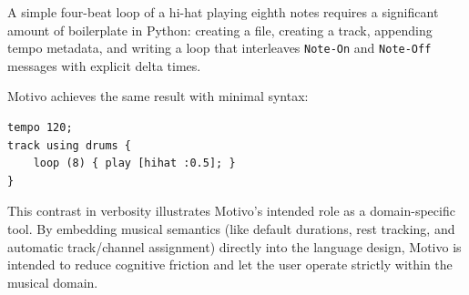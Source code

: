 A simple four-beat loop of a hi-hat playing eighth notes requires a significant amount of boilerplate in
Python: creating
a file, creating a track, appending tempo metadata, and writing a loop that interleaves \texttt{Note-On} and
\texttt{Note-Off} messages with explicit delta times.

Motivo achieves the same result with minimal syntax:
\begin{lstlisting}[language=Motivo, caption={Hi-hat loop in Motivo versus raw MIDI scripting.},
label={lst:midi-scripting-comparison}]
tempo 120;
track using drums {
    loop (8) { play [hihat :0.5]; }
}
\end{lstlisting}

This contrast in verbosity illustrates Motivo's intended role as a domain-specific tool.
By embedding musical semantics (like default durations, rest tracking, and automatic track/channel
assignment) directly into
the language design, Motivo is intended to reduce cognitive friction and let the user operate strictly within the
musical domain.
